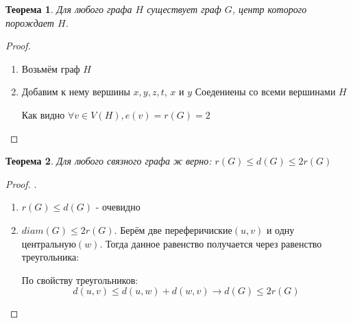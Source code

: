 \documentclass[a4paper, 12pt]{article}
\newtheorem*{theorem*}{Теорема}
\theoremstyle{definition}
\theoremstyle{definition}
\renewcommand{\leq}{\leqslant}
\begin{document}
  \begin{theorem*}
    Для любого графа $H$ существует граф $G$, центр которого порождает $H$.
  \end{theorem*}
  \begin{proof}
    \begin{enumerate}
        \item Возьмём граф $H$
        
        \item Добавим к нему вершины $x,y,z,t$, $x$ и $y$ Соедениены со всеми вершинами $H$
        

        Как видно $\forall v \in V(H), e(v)=r(G)=2$
    \end{enumerate}
  \end{proof}
  \begin{theorem*}
  Для любого связного графа ж верно: $r(G)\leq d(G)\leq 2r(G)$
  \end{theorem*}
  \begin{proof}
    .
    \begin{enumerate}
        \item $r(G)\leq d(G)$ - очевидно
        \item $diam(G)\leq 2r(G)$. Берём две переферичиские$(u,v)$ и одну центральную$(w)$. Тогда данное равенство получается через равенство треугольника:
        

        По свойству треугольников:$$d(u,v)\leq d(u,w)+d(w,v)\rightarrow d(G)\leq2r(G)$$
    \end{enumerate}
  \end{proof}
\end{document}
